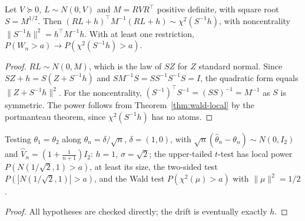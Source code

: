 \begin{theorem}
\label{thm:wald-local-ncchi}
\leanok
{}
Let $V\succeq0$, $L\sim N(0,V)$ and $M = RVR^\top$ positive definite, with square root $S = M^{1/2}$. Then
$(RL+h)^\top M^{-1}(RL+h)\sim\chi^2(S^{-1}h)$, with noncentrality $\|S^{-1}h\|^2 = h^\top M^{-1}h$. With at least one
restriction, $P(W_n > a)\to P(\chi^2(S^{-1}h) > a)$.
\end{theorem}
\begin{proof}
\leanok
$RL\sim N(0,M)$, which is the law of $SZ$ for $Z$ standard normal. Since $SZ+h = S(Z+S^{-1}h)$ and
$SM^{-1}S = SS^{-1}S^{-1}S = I$, the quadratic form equals $\|Z+S^{-1}h\|^2$. For the noncentrality,
$(S^{-1})^\top S^{-1} = (SS)^{-1} = M^{-1}$ as $S$ is symmetric. The power follows from Theorem~\ref{thm:wald-local} by the
portmanteau theorem, since $\chi^2(S^{-1}h)$ has no atoms.
\end{proof}

\begin{theorem}[Example]
\label{thm:local-power-witness}
\leanok
{}
Testing $\theta_1 = \theta_2$ along $\theta_n = \delta/\sqrt n$, $\delta = (1,0)$, with
$\sqrt n(\hat\theta_n-\theta_n)\sim N(0,I_2)$ and $\hat V_n = (1+\frac1{n+1})I_2$: $h = 1$, $\sigma = \sqrt2$; the
upper-tailed $t$-test has local power $P(N(1/\sqrt2,1) > a)$, at least its size, the two-sided test
$P(|N(1/\sqrt2,1)| > a)$, and the Wald test $P(\chi^2(\mu) > a)$ with $\|\mu\|^2 = 1/2$.
\end{theorem}
\begin{proof}
\leanok
All hypotheses are checked directly; the drift is eventually exactly $h$.
\end{proof}
